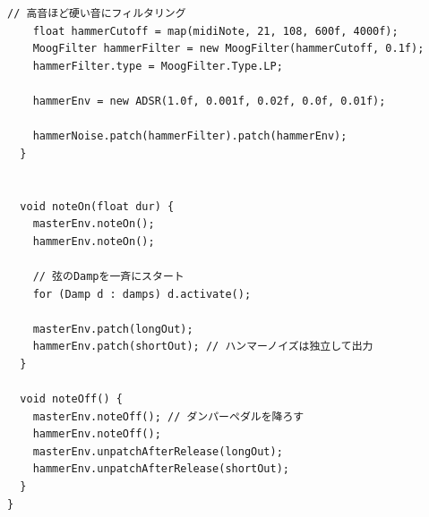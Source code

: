 \begin{lstlisting}[caption={Piano.pde}, label={lst:proc_piano}]
    // 高音ほど硬い音にフィルタリング
    float hammerCutoff = map(midiNote, 21, 108, 600f, 4000f);
    MoogFilter hammerFilter = new MoogFilter(hammerCutoff, 0.1f);
    hammerFilter.type = MoogFilter.Type.LP; 
    
    hammerEnv = new ADSR(1.0f, 0.001f, 0.02f, 0.0f, 0.01f);
    
    hammerNoise.patch(hammerFilter).patch(hammerEnv);
  }
  
  
  void noteOn(float dur) {
    masterEnv.noteOn();
    hammerEnv.noteOn();
    
    // 弦のDampを一斉にスタート
    for (Damp d : damps) d.activate(); 
    
    masterEnv.patch(longOut); 
    hammerEnv.patch(shortOut); // ハンマーノイズは独立して出力
  }
  
  void noteOff() {
    masterEnv.noteOff(); // ダンパーペダルを降ろす
    hammerEnv.noteOff(); 
    masterEnv.unpatchAfterRelease(longOut); 
    hammerEnv.unpatchAfterRelease(shortOut);
  }
}
\end{lstlisting}

